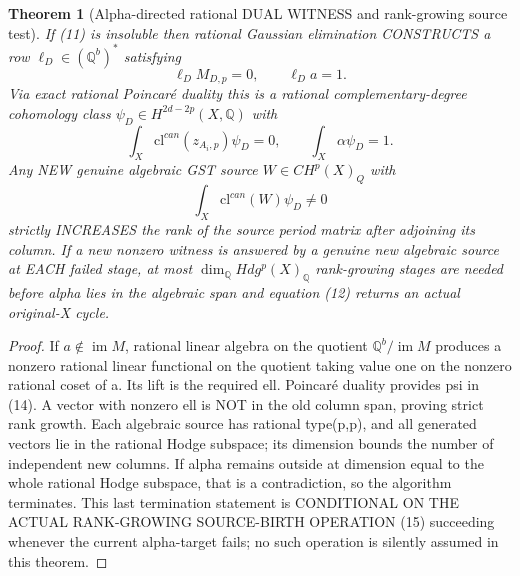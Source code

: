 \documentclass[11pt]{article}
\newtheorem{theorem}{Theorem}[section]
\begin{document}
\begin{theorem}[Alpha-directed rational DUAL WITNESS and rank-growing source test]
If (11) is insoluble then rational Gaussian
elimination CONSTRUCTS a row
\(\ell_D\in(\mathbb Q^b)^*\) satisfying
\[
 \boxed{\ell_D M_{D,p}=0,\qquad
                    \ell_D a=1.}               \tag{13}
\]
Via exact rational Poincaré duality this is
a rational complementary-degree cohomology class
\(\psi_D\in H^{2d-2p}(X,\mathbb Q)\)
with
\[
 \int_X \mathrm{cl}^{can}(z_{A_i,p})\psi_D=0,
 \qquad \int_X\alpha\psi_D=1.                 \tag{14}
\]
Any NEW genuine algebraic GST source \(W\in CH^p(X)_Q\)
with
\[
 \boxed{\int_X\mathrm{cl}^{can}(W)\psi_D\ne0}   \tag{15}
\]
strictly INCREASES the rank of the source period
matrix after adjoining its column.
If a new nonzero witness is answered by a genuine
new algebraic source at EACH failed stage,
at most \(\dim_\mathbb Q Hdg^p(X)_\mathbb Q\)
rank-growing stages are needed before alpha lies
in the algebraic span and equation (12) returns
an actual original-X cycle.
\end{theorem}
\begin{proof}
If \(a\notin\operatorname{im}M\),
rational linear algebra on the quotient
\(\mathbb Q^b/\operatorname{im}M\)
produces a nonzero rational linear functional
on the quotient taking value one on the
nonzero rational coset of a.
Its lift is the required ell.
Poincaré duality provides psi in (14).
A vector with nonzero ell is NOT in the
old column span, proving strict rank growth.
Each algebraic source has rational type(p,p),
and all generated vectors lie in the
rational Hodge subspace; its dimension bounds
the number of independent new columns.
If alpha remains outside at dimension equal to
the whole rational Hodge subspace, that is a
contradiction, so the algorithm terminates.
This last termination statement is CONDITIONAL
ON THE ACTUAL RANK-GROWING SOURCE-BIRTH
OPERATION (15) succeeding whenever the
current alpha-target fails; no such operation
is silently assumed in this theorem.
\end{proof}
\end{document}
